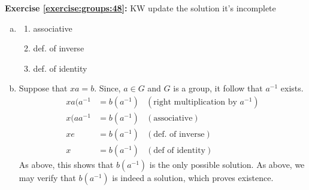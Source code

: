 \noindent\textbf{Exercise \ref{exercise:groups:48}:}  KW update the solution it's incomplete
\begin{enumerate}[(a)]
\item 
%
%
% 
%
%
	\begin{multicols}{2}
	\begin{enumerate}
	\item
	associative
	
	\item
	def. of inverse
	
	\item
	def. of identity
	\end{enumerate}
	\end{multicols}
	
\item
Suppose that $xa = b$. Since, $a \in G$ and $G$ is a group, it follow that $a^{-1}$ exists.\\
\begin{align*}
xa(a^{-1} &= b(a^{-1})	& (\text{right multiplication by $a^{-1}$})\\
x(aa^{-1} &= b(a^{-1})	& (\text{associative})\\
xe &= b(a^{-1})	& (\text{def. of inverse})\\
x &= b(a^{-1})	& (\text{def of identity})
\end{align*}
As above, this shows that $b (a^{-1})$ is the only possible solution. As above, we may verify that $b (a^{-1})$ is indeed a solution, which proves existence.
\end{enumerate}

